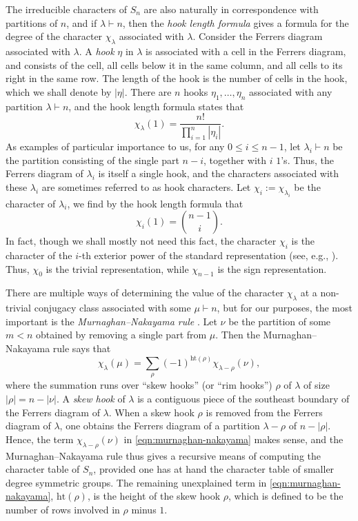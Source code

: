 \documentclass[12pt]{amsart}
\theoremstyle{definition} \newtheorem{definition}[theorem]{Definition}
\theoremstyle{example} \newtheorem{example}[theorem]{Example}
\theoremstyle{remark} \newtheorem{remark}{Remark}[theorem]
\numberwithin{equation}{section}
\numberwithin{theorem}{section}
\renewcommand{\leq}{\leqslant}
\begin{document}
	The irreducible characters of $S_n$ are also naturally in correspondence with partitions of $n$, and if $\lambda \vdash n$, then the \emph{hook length formula} gives a formula for the degree of the character $\chi_\lambda$ associated with $\lambda$.  Consider the Ferrers diagram associated with $\lambda$.  A \emph{hook} $\eta$ in $\lambda$ is associated with a cell in the Ferrers diagram, and consists of the cell, all cells below it in the same column, and all cells to its right in the same row.  The length of the hook is the number of cells in the hook, which we shall denote by $|\eta|$.  There are $n$ hooks $\eta_1,\dots,\eta_n$ associated with any partition $\lambda \vdash n$, and the hook length formula \cite[Formula 4.12]{FultonHarris} states that
		\[
			\chi_\lambda(1)
				= \frac{ n!}{\prod_{i=1}^n |\eta_i|}.
		\]
	As examples of particular importance to us, for any $0 \leq i \leq n-1$, let $\lambda_i \vdash n$ be the partition consisting of the single part $n-i$, together with $i$ $1$'s.  Thus, the Ferrers diagram of $\lambda_i$ is itself a single hook, and the characters associated with these $\lambda_i$ are sometimes referred to as hook characters.  Let $\chi_i := \chi_{\lambda_i}$ be the character of $\lambda_i$, we find by the hook length formula that
		\[
			\chi_i(1)
				= \binom{n-1}{i}.
		\]
	In fact, though we shall mostly not need this fact, the character $\chi_i$ is the character of the $i$-th exterior power of the standard representation (see, e.g., \cite[Exercise 4.6]{FultonHarris}).  Thus, $\chi_0$ is the trivial representation, while $\chi_{n-1}$ is the sign representation.  
	
	There are multiple ways of determining the value of the character $\chi_\lambda$ at a non-trivial conjugacy class associated with some $\mu \vdash n$, but for our purposes, the most important is the \emph{Murnaghan--Nakayama rule} \cite[Problem 4.45]{FultonHarris}.  Let $\nu$ be the partition of some $m < n$ obtained by removing a single part from $\mu$.  Then the Murnaghan--Nakayama rule says that
		\begin{equation} \label{eqn:murnaghan-nakayama}
			\chi_\lambda(\mu)
				= \sum_{\rho} (-1)^{\mathrm{ht}(\rho)} \chi_{\lambda - \rho} (\nu),
		\end{equation}
	where the summation runs over ``skew hooks'' (or ``rim hooks'') $\rho$ of $\lambda$ of size $|\rho| = n - |\nu|$.  A \emph{skew hook} of $\lambda$ is a contiguous piece of the southeast boundary of the Ferrers diagram of $\lambda$.  When a skew hook $\rho$ is removed from the Ferrers diagram of $\lambda$, one obtains the Ferrers diagram of a partition $\lambda - \rho$ of $n - |\rho|$.  Hence, the term $\chi_{\lambda - \rho}(\nu)$ in \eqref{eqn:murnaghan-nakayama} makes sense, and the Murnaghan--Nakayama rule thus gives a recursive means of computing the character table of $S_n$, provided one has at hand the character table of smaller degree symmetric groups.  The remaining unexplained term in \eqref{eqn:murnaghan-nakayama}, $\mathrm{ht}(\rho)$, is the height of the skew hook $\rho$, which is defined to be the number of rows involved in $\rho$ minus $1$.
	
\end{document}
